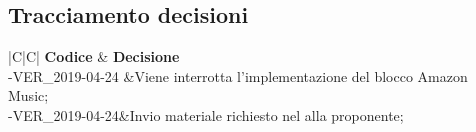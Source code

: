 \documentclass[a4paper,12pt]{article}
\begin{document}
	\newpage
	\subsection{Tracciamento decisioni}
	\begin{table}[tbph]
		\centering
		\begin{tabularx}{\textwidth}{|C|C|}
			\hline
			\textbf{Codice } & \textbf{Decisione} \\
			-VER\_2019-04-24 &Viene interrotta l'implementazione del blocco Amazon Music;\\
			-VER\_2019-04-24&Invio materiale richiesto nel alla proponente;\\
			\hline
		\end{tabularx}
		\caption{Tracciamento decisioni}
	\end{table}
\end{document}
